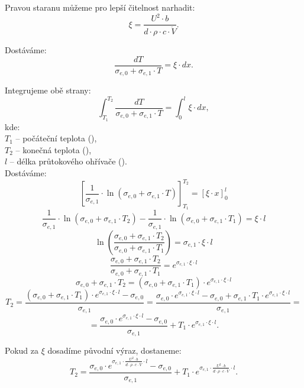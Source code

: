 \documentclass{article}
\begin{document}
Pravou staranu můžeme pro lepší čitelnost narhadit:
$$
    \xi = \frac{U^2 \cdot b}{d \cdot \rho \cdot c \cdot \dot{V}}.
$$

Dostáváme:
$$
    \frac{dT}{\sigma_{e,0} + \sigma_{e,1} \cdot T} = \xi \cdot dx.
$$

Integrujeme obě strany:
$$
    \int_{T_1}^{T_2} \frac{dT}{\sigma_{e,0} + \sigma_{e,1} \cdot T} = \int_{0}^{l} \xi \cdot dx,
$$
kde:\\
$T_1$ -- počáteční teplota (\ueqK),\\
$T_2$ -- konečná teplota (\ueqK),\\
$l$ -- délka průtokového ohřívače (\ueqM).\\

Dostáváme:
$$
    \left[ \frac{1}{\sigma_{e,1}} \cdot \ln \left( \sigma_{e,0} + \sigma_{e,1} \cdot T \right) \right]_{T_1}^{T_2} = \left[ \xi \cdot x \right]_0^l
$$
$$
    \frac{1}{\sigma_{e,1}} \cdot \ln \left( \sigma_{e,0} + \sigma_{e,1} \cdot T_2 \right) - \frac{1}{\sigma_{e,1}} \cdot \ln \left( \sigma_{e,0} + \sigma_{e,1} \cdot T_1 \right) = \xi \cdot l
$$
$$
    \ln \left( \frac{\sigma_{e,0} + \sigma_{e,1} \cdot T_2}{\sigma_{e,0} + \sigma_{e,1} \cdot T_1} \right) = \sigma_{e,1} \cdot \xi \cdot l
$$
$$
    \frac{\sigma_{e,0} + \sigma_{e,1} \cdot T_2}{\sigma_{e,0} + \sigma_{e,1} \cdot T_1} = e^{\sigma_{e,1} \cdot \xi \cdot l}
$$
$$
    \sigma_{e,0} + \sigma_{e,1} \cdot T_2 = \left( \sigma_{e,0} + \sigma_{e,1} \cdot T_1 \right) \cdot e^{\sigma_{e,1} \cdot \xi \cdot l}
$$
$$
    T_2 = \frac{\left( \sigma_{e,0} + \sigma_{e,1} \cdot T_1 \right) \cdot e^{\sigma_{e,1} \cdot \xi \cdot l} - \sigma_{e,0}}{\sigma_{e,1}} = \frac{\sigma_{e,0} \cdot e^{\sigma_{e,1} \cdot \xi \cdot l} - \sigma_{e,0} + \sigma_{e,1} \cdot T_1 \cdot e^{\sigma_{e,1} \cdot \xi \cdot l}}{\sigma_{e,1}} =
$$
$$
    = \frac{\sigma_{e,0} \cdot e^{\sigma_{e,1} \cdot \xi \cdot l} - \sigma_{e,0}}{\sigma_{e,1}} + T_1 \cdot e^{\sigma_{e,1} \cdot \xi \cdot l}.
$$

Pokud za $\xi$ dosadíme původní výraz, dostaneme:
$$
    T_2 = \frac{\sigma_{e,0} \cdot e^{\sigma_{e,1} \cdot \frac{U^2 \cdot b}{d \cdot \rho \cdot c \cdot \dot{V}} \cdot l} - \sigma_{e,0}}{\sigma_{e,1}} + T_1 \cdot e^{\sigma_{e,1} \cdot \frac{U^2 \cdot b}{d \cdot \rho \cdot c \cdot \dot{V}} \cdot l}.
$$
\end{document}
